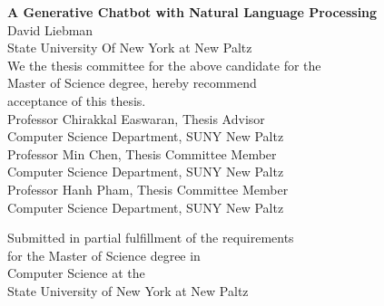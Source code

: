 \documentclass[notitlepage]{report}
\begin{document}
\begin{center}
	\textbf{\large A Generative Chatbot with Natural Language Processing} \\
	David Liebman \\
	State University Of New York at New Paltz \\
	\vspace{1cm}
	\vspace{1cm}
	We the thesis committee for the above candidate for the \\
	Master of Science degree, hereby recommend \\
	acceptance of this thesis. \\
		\vspace{1cm}
		\vspace{1cm}
	Professor Chirakkal Easwaran, Thesis Advisor \\
	Computer Science Department, SUNY New Paltz\\
		\vspace{1cm}
		\vspace{1cm}
	Professor Min Chen, Thesis Committee Member \\
	Computer Science Department, SUNY New Paltz \\
		\vspace{1cm}
		\vspace{1cm}
	Professor Hanh Pham, Thesis Committee Member \\
	Computer Science Department, SUNY New Paltz \\
		\vspace{1cm}
		\vspace{1cm}
\end{center}



\begin{center}
	Submitted in partial fulfillment of the requirements \\
	for the Master of Science degree in \\
	Computer Science at the \\
	State University of New York at New Paltz \\
\end{center}


\newpage


\end{document}
